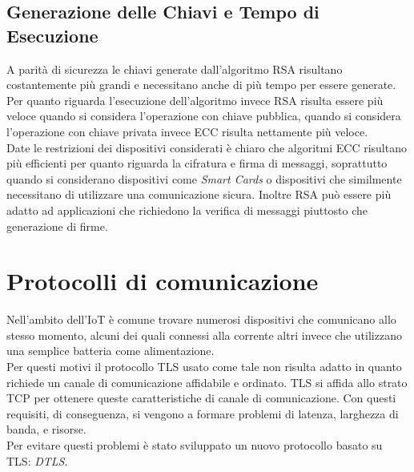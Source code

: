 \documentclass[12pt, a4paper]{report}
\begin{document}
\subsection{Generazione delle Chiavi e Tempo di Esecuzione}
A parità di sicurezza le chiavi generate dall'algoritmo RSA risultano costantemente più grandi e necessitano anche di più tempo
per essere generate.
\\Per quanto riguarda l'esecuzione dell'algoritmo invece RSA risulta essere più veloce quando si considera l'operazione con chiave pubblica,
quando si considera l'operazione con chiave privata invece ECC risulta nettamente più veloce.
\\Date le restrizioni dei dispositivi considerati è chiaro che algoritmi ECC risultano più efficienti per 
quanto riguarda la cifratura e firma di messaggi, soprattutto quando si considerano dispositivi come \textit{Smart Cards} o dispositivi che similmente necessitano di utilizzare una comunicazione sicura.
Inoltre RSA può essere più adatto ad applicazioni che richiedono la verifica di messaggi piuttosto che generazione di firme.

\section{Protocolli di comunicazione}
Nell'ambito dell'IoT è comune trovare numerosi dispositivi che comunicano allo stesso momento, 
alcuni dei quali connessi alla corrente altri invece che utilizzano 
una semplice batteria come alimentazione.
\\Per questi motivi il protocollo TLS usato come tale non risulta adatto
in quanto richiede un canale di comunicazione affidabile e ordinato.
TLS si affida allo strato TCP per ottenere queste caratteristiche di canale di comunicazione.
Con questi requisiti, di conseguenza, si vengono a formare problemi di latenza,
larghezza di banda, e risorse.
\\Per evitare questi problemi è stato sviluppato un nuovo protocollo basato su TLS: \textit{DTLS}.
\end{document}
